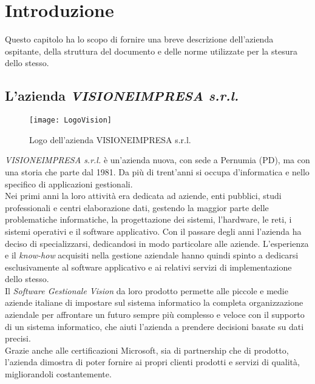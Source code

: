 
\chapter{Introduzione}
\label{cap:introduzione}
Questo capitolo ha lo scopo di fornire una breve descrizione dell'azienda ospitante, della struttura del documento e delle norme utilizzate per la stesura dello stesso.

\section{L'azienda \emph{VISIONEIMPRESA s.r.l.}}

\begin{figure}[!h] 
    \centering 
    \texttt{[image: LogoVision]} 
    \caption{Logo dell'azienda VISIONEIMPRESA s.r.l.}
\end{figure}

\emph{VISIONEIMPRESA s.r.l.} è un’azienda nuova, con sede a Pernumia (PD), ma con una storia che parte dal 1981. Da più di trent’anni si occupa d’informatica e nello specifico di applicazioni gestionali.\\
Nei primi anni la loro attività era dedicata ad aziende, enti pubblici, studi professionali e centri elaborazione dati, gestendo la maggior parte delle problematiche informatiche, la progettazione dei sistemi, l’hardware, le reti, i sistemi operativi e il software applicativo. Con il passare degli anni l’azienda ha deciso di specializzarsi, dedicandosi in modo particolare alle aziende. L’esperienza e il \textit{know-how} acquisiti nella gestione aziendale hanno quindi spinto a dedicarsi esclusivamente al software applicativo e ai relativi servizi di implementazione dello stesso.\\
Il \textit{Software Gestionale Vision} da loro prodotto permette alle piccole e medie aziende italiane di impostare sul sistema informatico la completa organizzazione aziendale per affrontare un futuro sempre più complesso e veloce con il supporto di un sistema informatico, che aiuti l’azienda a prendere decisioni basate su dati precisi.\\
Grazie anche alle certificazioni Microsoft, sia di partnership che di prodotto, l’azienda dimostra di poter fornire ai propri clienti prodotti e servizi di qualità, migliorandoli costantemente.

